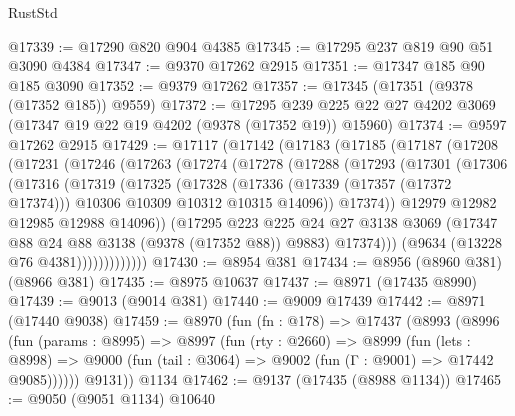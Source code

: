 \begin{lexlean}{RustStd}
\begin{coremodule}
@17339 := @17290 @820 @904 @4385
@17345 := @17295 @237 @819 @90 @51 @3090 @4384
@17347 := @9370 @17262 @2915
@17351 := @17347 @185 @90 @185 @3090
@17352 := @9379 @17262
@17357 := @17345 (@17351 (@9378 (@17352 @185)) @9559)
@17372 := @17295
    @239
    @225
    @22
    @27
    @4202
    @3069
    (@17347 @19 @22 @19 @4202 (@9378 (@17352 @19)) @15960)
@17374 := @9597 @17262 @2915
@17429 := @17117
    (@17142
      (@17183
        (@17185
          (@17187
            (@17208
              (@17231
                (@17246
                  (@17263
                    (@17274
                      (@17278
                        (@17288
                          (@17293
                            (@17301
                              (@17306
                                (@17316
                                  (@17319
                                    (@17325
                                      (@17328
                                        (@17336
                                          (@17339 (@17357 (@17372 @17374)))
                                          @10306
                                          @10309
                                          @10312
                                          @10315
                                          @14096))
                                      @17374))
                                  @12979
                                  @12982
                                  @12985
                                  @12988
                                  @14096))
                              (@17295
                                @223
                                @225
                                @24
                                @27
                                @3138
                                @3069
                                (@17347 @88 @24 @88 @3138 (@9378 (@17352 @88)) @9883)
                                @17374)))
                          (@9634 (@13228 @76 @4381)))))))))))))
@17430 := @8954 @381
@17434 := @8956 (@8960 @381) (@8966 @381)
@17435 := @8975 @10637
@17437 := @8971 (@17435 @8990)
@17439 := @9013 (@9014 @381)
@17440 := @9009 @17439
@17442 := @8971 (@17440 @9038)
@17459 := @8970
    (fun (fn : @178) =>
    @17437
      (@8993
        (@8996
          (fun (params : @8995) =>
          @8997
            (fun (rty : @2660) =>
            @8999
              (fun (lets : @8998) =>
              @9000 (fun (tail : @3064) => @9002 (fun (Γ : @9001) => @17442 @9085))))))
        @9131))
    @1134
@17462 := @9137 (@17435 (@8988 @1134))
@17465 := @9050 (@9051 @1134) @10640

\end{coremodule}
\end{lexlean}
